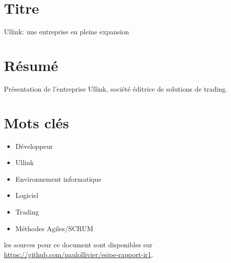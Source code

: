 \begin{titlepage}
\begin{center}
\section*{Titre}
Ullink: une entreprise en pleine expansion

\section*{Résumé}
Présentation de l'entreprise Ullink, société éditrice de solutions de trading.

\section*{Mots clés}
\begin{multicols}{2}
\begin{itemize}
\item Développeur
\item Ullink
\item Environnement informatique
\item Logiciel
\item Trading
\item Méthodes Agiles/SCRUM
\end{itemize}
\end{multicols}



\vfill
les sources pour ce document sont disponibles sur \url{https://github.com/paulollivier/esipe-rapport-ir1}.
\end{center}
\end{titlepage}
